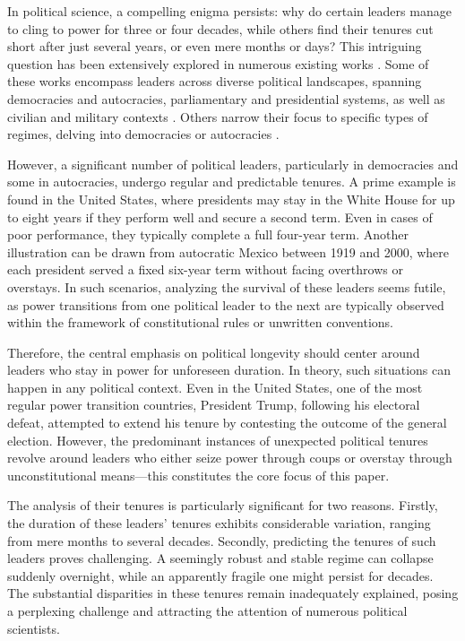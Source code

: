 \documentclass[
  12pt,
  a4paper,
  12pt]{article}
\begin{document}
In political science, a compelling enigma persists: why do certain
leaders manage to cling to power for three or four decades, while others
find their tenures cut short after just several years, or even mere
months or days? This intriguing question has been extensively explored
in numerous existing works
\citep[\citet{buenodemesquita2003}]{clinton1975politics}. Some of these
works encompass leaders across diverse political landscapes, spanning
democracies and autocracies, parliamentary and presidential systems, as
well as civilian and military contexts \citep{buenodemesquita2003}.
Others narrow their focus to specific types of regimes, delving into
democracies \citep{svolik2014} or autocracies \citep{davenport2021}.

However, a significant number of political leaders, particularly in
democracies and some in autocracies, undergo regular and predictable
tenures. A prime example is found in the United States, where presidents
may stay in the White House for up to eight years if they perform well
and secure a second term. Even in cases of poor performance, they
typically complete a full four-year term. Another illustration can be
drawn from autocratic Mexico between 1919 and 2000, where each president
served a fixed six-year term without facing overthrows or overstays. In
such scenarios, analyzing the survival of these leaders seems futile, as
power transitions from one political leader to the next are typically
observed within the framework of constitutional rules or unwritten
conventions.

Therefore, the central emphasis on political longevity should center
around leaders who stay in power for unforeseen duration. In theory,
such situations can happen in any political context. Even in the United
States, one of the most regular power transition countries, President
Trump, following his electoral defeat, attempted to extend his tenure by
contesting the outcome of the general election. However, the predominant
instances of unexpected political tenures revolve around leaders who
either seize power through coups or overstay through unconstitutional
means---this constitutes the core focus of this paper.

The analysis of their tenures is particularly significant for two
reasons. Firstly, the duration of these leaders' tenures exhibits
considerable variation, ranging from mere months to several decades.
Secondly, predicting the tenures of such leaders proves challenging. A
seemingly robust and stable regime can collapse suddenly overnight,
while an apparently fragile one might persist for decades. The
substantial disparities in these tenures remain inadequately explained,
posing a perplexing challenge and attracting the attention of numerous
political scientists.
\end{document}
